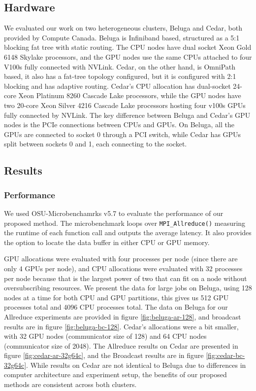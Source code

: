 

\subsection{Hardware}\label{sec:CH4-eval-hardware}
We evaluated our work on two heterogeneous clusters, Beluga and Cedar, both provided by Compute Canada. 
Beluga is Infiniband based, structured as a 5:1 blocking fat tree with static routing.  
The CPU nodes have dual socket Xeon Gold 6148 Skylake processors, and the GPU nodes use the same CPUs attached to four V100s fully connected with NVLink.
Cedar, on the other hand, is OmniPath based, it also has a fat-tree topology configured, but it is configured with 2:1 blocking and has adaptive routing.
Cedar's CPU allocation has dual-socket 24-core Xeon Platinum 8260 Cascade Lake processors, while the GPU nodes have two 20-core Xeon Silver 4216 Cascade Lake processors hosting four v100s GPUs fully connected by NVLink.
The key difference between Beluga and Cedar's GPU nodes is the PCIe connections between CPUs and GPUs.
On Beluga, all the GPUs are connected to socket 0 through a PCI switch, while Cedar has GPUs split between sockets 0 and 1, each connecting to the socket.

\subsection{Results}

\subsubsection{Performance}

We used OSU-Microbenchamrks v5.7 \cite{Bureddy2012OMB} to evaluate the performance of our proposed method. 
The microbenchmark loops over \texttt{MPI\_Allreduce()} measuring the runtime of each function call and outputs the average latency. 
It also provides the option to locate the data buffer in either CPU or GPU memory.

GPU allocations were evaluated with four processes per node (since there are only 4 GPUs per node), and CPU allocations were evaluated with 32 processes per node because that is the largest power of two that can fit on a node without oversubscribing resources.
We present the data for large jobs on Beluga, using 128 nodes at a time for both CPU and GPU partitions, this gives us 512 GPU processes total and 4096 CPU processes total.
The data on Beluga for our Allreduce experiments are provided in figure \ref{fig:beluga-ar-128}, and broadcast results are in figure \ref{fig:beluga-bc-128}.
Cedar's allocations were a bit smaller, with 32 GPU nodes (communicator size of 128) and 64 CPU nodes (communicator size of 2048).
The Allreduce results on Cedar are presented in figure \ref{fig:cedar-ar-32g64c}, and the Broadcast results are in figure \ref{fig:cedar-bc-32g64c}.
While results on Cedar are not identical to Beluga due to differences in computer architecture and experiment setup, the benefits of our proposed methods are consistent across both clusters.

